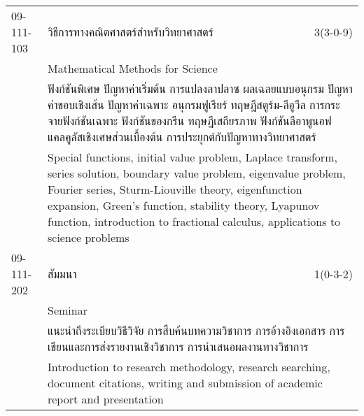 \begin{longtable}{p{}p{}r{}}
09-111-103 & วิธีการทางคณิตศาสตร์สำหรับวิทยาศาสตร์ & 3(3-0-9)\\*
 & Mathematical Methods for Science & \phantom{x} \vspace{3mm} \\*
&  \multicolumn{2}{p{0.75\textwidth}}{ฟังก์ชันพิเศษ ปัญหาค่าเริ่มต้น การแปลงลาปลาซ ผลเฉลยแบบอนุกรม ปัญหาค่าขอบเชิงเส้น ปัญหาค่าเฉพาะ อนุกรมฟูเรียร์ ทฤษฎีสตูร์ม-ลีอูวีล การกระจายฟังก์ชันเฉพาะ ฟังก์ชันของกรีน ทฤษฎีเสถียรภาพ ฟังก์ชันลีอาพูนอฟ แคลคูลัสเชิงเศษส่วนเบื้องต้น การประยุกต์กับปัญหาทางวิทยาศาสตร์} \vspace{3mm} \\*
&  \multicolumn{2}{p{0.75\textwidth}}{Special functions, initial value problem, Laplace transform, series solution, boundary value problem, eigenvalue problem, Fourier series, Sturm-Liouville theory, eigenfunction expansion, Green’s function, stability theory, Lyapunov function, introduction to fractional calculus, applications to science problems} \vspace{8mm} \\*
09-111-202 & สัมมนา & 1(0-3-2)\\*
 & Seminar & \phantom{x} \vspace{3mm} \\*
&  \multicolumn{2}{p{0.75\textwidth}}{แนะนำถึงระเบียบวิธีวิจัย การสืบค้นบทความวิชาการ การอ้างอิงเอกสาร การเขียนและการส่งรายงานเชิงวิชาการ การนำเสนอผลงานทางวิชาการ} \vspace{3mm} \\*
&  \multicolumn{2}{p{0.75\textwidth}}{Introduction to research methodology, research searching, document citations, writing and submission of academic report and presentation} \vspace{8mm} \\*
\end{longtable}
